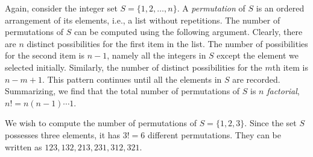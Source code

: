 Again, consider the integer set $S = \{ 1, 2, \ldots, n \}$.
A \emph{permutation} of $S$ is an ordered arrangement of its elements, i.e., a list without repetitions. 
The number of permutations of $S$ can be computed using the following argument.
Clearly, there are $n$ distinct possibilities for the first item in the list.
The number of possibilities for the second item is $n-1$, namely all the integers in $S$ except the element we selected initially.
Similarly, the number of distinct possibilities for the $m$th item is $n - m + 1$.
This pattern continues until all the elements in $S$ are recorded.
Summarizing, we find that the total number of permutations of $S$ is $n$ \emph{factorial}, $n! = n (n-1) \cdots 1$. 

\begin{example}
We wish to compute the number of permutations of $S = \{ 1, 2, 3 \}$.
Since the set $S$ possesses three elements, it has $3! = 6$ different permutations.
They can be written as $123, 132, 213, 231, 312, 321$.
\end{example}


